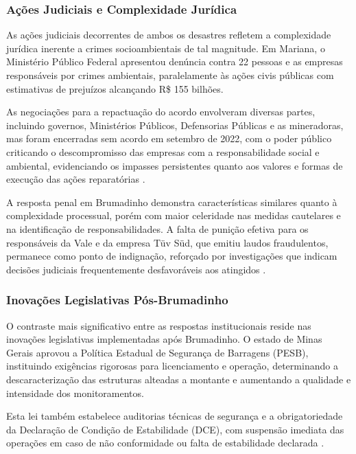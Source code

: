 \subsubsection{Ações Judiciais e Complexidade Jurídica}

As ações judiciais decorrentes de ambos os desastres refletem a complexidade jurídica inerente a crimes socioambientais de tal magnitude. Em Mariana, o Ministério Público Federal apresentou denúncia contra 22 pessoas e as empresas responsáveis por crimes ambientais, paralelamente às ações civis públicas com estimativas de prejuízos alcançando R\$ 155 bilhões.

As negociações para a repactuação do acordo envolveram diversas partes, incluindo governos, Ministérios Públicos, Defensorias Públicas e as mineradoras, mas foram encerradas sem acordo em setembro de 2022, com o poder público criticando o descompromisso das empresas com a responsabilidade social e ambiental, evidenciando os impasses persistentes quanto aos valores e formas de execução das ações reparatórias \cite{brasil2024timeline}.

A resposta penal em Brumadinho demonstra características similares quanto à complexidade processual, porém com maior celeridade nas medidas cautelares e na identificação de responsabilidades. A falta de punição efetiva para os responsáveis da Vale e da empresa Tüv Süd, que emitiu laudos fraudulentos, permanece como ponto de indignação, reforçado por investigações que indicam decisões judiciais frequentemente desfavoráveis aos atingidos \cite{modelli2024brumadinho}.

\subsubsection{Inovações Legislativas Pós-Brumadinho}

O contraste mais significativo entre as respostas institucionais reside nas inovações legislativas implementadas após Brumadinho. O estado de Minas Gerais aprovou a Política Estadual de Segurança de Barragens (PESB), instituindo exigências rigorosas para licenciamento e operação, determinando a descaracterização das estruturas alteadas a montante e aumentando a qualidade e intensidade dos monitoramentos.

Esta lei também estabelece auditorias técnicas de segurança e a obrigatoriedade da Declaração de Condição de Estabilidade (DCE), com suspensão imediata das operações em caso de não conformidade ou falta de estabilidade declarada \cite{minasgerais2024historico}.

